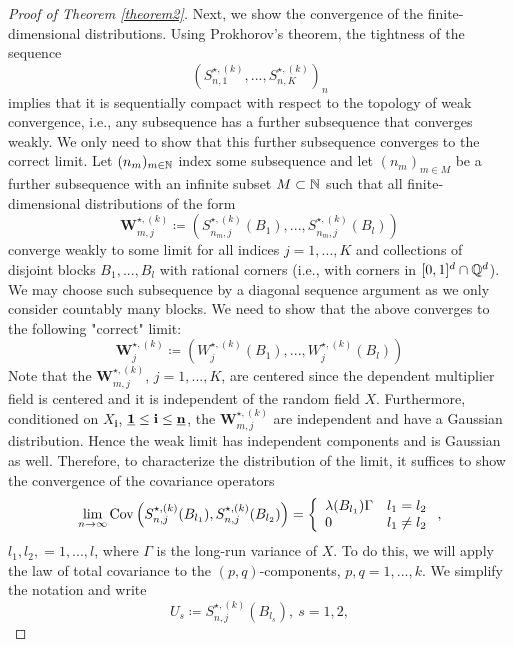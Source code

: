 \begin{proof}[Proof of Theorem \ref{theorem2}]
    Next, we show the convergence of the finite-dimensional distributions. Using Prokhorov's theorem, the tightness of the sequence
    \[ \left( S_{n, 1}^{\star, (k)}, ..., S_{n, K}^{\star, (k)} \right)_n \]
    implies that it is sequentially compact with respect to the topology of weak convergence, i.e., any subsequence has a further subsequence that converges weakly. We only need to show that this further subsequence converges to the correct limit. Let $(n_m)_{m \in \mathbb{N}}$ index some subsequence and let $(n_m)_{m \in M}$ be a further subsequence with an infinite subset $M \subset \mathbb{N}$ such that all finite-dimensional distributions of the form
    \[ \mathbf{W}_{m, j}^{\star, (k)} \coloneqq \left( S_{n_m, j}^{\star, (k)}(B_1), ..., S_{n_m, j}^{\star, (k)}(B_l) \right) \]
    converge weakly to some limit for all indices $j = 1, ..., K$ and collections of disjoint blocks $B_1, ..., B_l$ with rational corners (i.e., with corners in $[0,1]^d \cap \mathbb{Q}^d$). We may choose such subsequence by a diagonal sequence argument as we only consider countably many blocks.
    We need to show that the above converges to the following "correct" limit:
    \[ \mathbf{W}_j^{\star, (k)} \coloneqq \left( W_{j}^{\star, (k)}(B_1), ..., W_{j}^{\star, (k)}(B_l) \right) \]
    Note that the $\mathbf{W}_{m, j}^{\star, (k)}$, $j = 1, ..., K$, are centered since the dependent multiplier field is centered and it is independent of the random field $X$. Furthermore, conditioned on $X_\mathbf{i}$, $\usbf[1] \leq \mathbf{i} \leq \usbf[n]$, the $\mathbf{W}_{m, j}^{\star, (k)}$ are independent and have a Gaussian distribution. Hence the weak limit has independent components and is Gaussian as well. Therefore, to characterize the distribution of the limit, it suffices to show the convergence of the covariance operators
    \begin{equation} \label{thm 2 proof convergence covariance}
        \lim\limits_{n \to \infty} \mathrm{Cov}\left( S_{n, j}^{\star, (k)}(B_{l_1}), S_{n, j}^{\star, (k)}(B_{l_2}) \right) = \left\{
        \begin{array}{ll}
        \lambda(B_{l_1}) \Gamma & l_1 = l_2 \\
        0 & l_1 \neq l_2 
        \end{array}
        \right. ,
    \end{equation}
    $l_1, l_2, = 1, ..., l$, where $\Gamma$ is the long-run variance of $X$.
    To do this, we will apply the law of total covariance to the $(p, q)$-components, $p, q = 1, ..., k$. We simplify the notation and write
    \[ U_s \coloneqq S_{n, j}^{\star, (k)}(B_{l_s}), \ s = 1, 2, \]

\end{proof}
